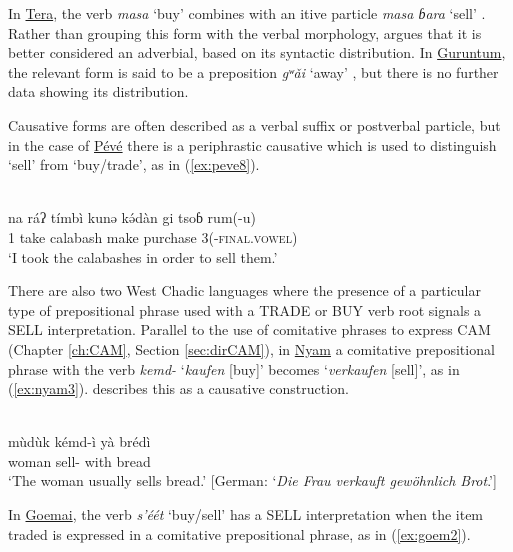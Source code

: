 In \hyperref[tera]{Tera}, the verb \textit{masa} `buy' combines with an itive particle \textit{masa ɓara} `sell' \citep[19]{newmanGrammarTeraTransformational1970}. Rather than grouping this form with the verbal morphology, \citet[314--315]{schuhChadicCornucopia2017} argues that it is better considered an adverbial, based on its syntactic distribution. In \hyperref[guru]{Guruntum}, the relevant form is said to be a preposition \textit{gʷǎi} `away'  \citep[173]{jaggarGuruntumGurdungWest1988}, but there is no further data showing its distribution. 

Causative forms are often described as a verbal suffix or postverbal particle, but in the case of \hyperref[peve]{Pévé} there is a periphrastic causative which is used to distinguish `sell' from `buy/trade', as in (\ref{ex:peve8}).

\ea\label{ex:peve8}
 \\
\gll  na ráʔ tímbì kunə kə́dàn gi tsoɓ rum(-u) \\
1 take calabash   make purchase 3(-\textsc{final.vowel}) \\
\glt `I took the calabashes in order to sell them.'
\z

There are also two West Chadic languages where the presence of a particular type of prepositional phrase used with a TRADE or BUY verb root signals a SELL interpretation. Parallel to the use of comitative phrases to express CAM (Chapter \ref{ch:CAM}, Section \ref{sec:dirCAM}), in \hyperref[nyam]{Nyam} a comitative prepositional phrase with the verb \textit{kemd-} `\textit{kaufen} [buy]' becomes `\textit{verkaufen} [sell]', as in (\ref{ex:nyam3}). \citet[127]{andreasGrammatischeBeschreibungNyam2012} describes this as a causative construction.

\ea\label{ex:nyam3}
 \\
\gll mùdùk kémd-ì yà brédì \\
woman sell- with bread \\
\glt `The woman usually sells bread.' [German: `\textit{Die Frau verkauft gewöhnlich Brot}.']
\z 

In \hyperref[goem]{Goemai}, the verb \textit{s'éét} `buy/sell' has a SELL interpretation when the item traded is expressed in a comitative prepositional phrase, as in (\ref{ex:goem2}).

